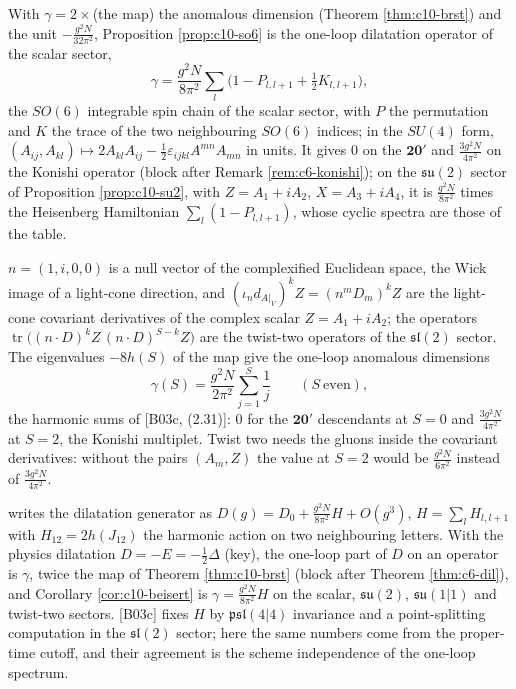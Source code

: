 \begin{remark}
With $\gamma=2\times$(the map) the anomalous dimension (Theorem \ref{thm:c10-brst}) and the unit $-\frac{g^2N}{32\pi^2}$, Proposition \ref{prop:c10-so6} is the one-loop dilatation operator of the scalar sector,
\[
\gamma=\frac{g^2N}{8\pi^2}\sum_{l}\big(1-P_{l,l+1}+\tfrac12K_{l,l+1}\big),
\]
the $SO(6)$ integrable spin chain of the scalar sector, with $P$ the permutation and $K$ the trace of the two neighbouring $SO(6)$ indices; in the $SU(4)$ form, $(A_{ij},A_{kl})\mapsto2A_{kl}A_{ij}-\tfrac12\varepsilon_{ijkl}A^{mn}A_{mn}$ in units. It gives $0$ on the $\mathbf{20'}$ and $\frac{3g^2N}{4\pi^2}$ on the Konishi operator (block after Remark \ref{rem:c6-konishi}); on the $\mathfrak{su}(2)$ sector of Proposition \ref{prop:c10-su2}, with $Z=A_1+iA_2$, $X=A_3+iA_4$, it is $\frac{g^2N}{8\pi^2}$ times the Heisenberg Hamiltonian $\sum_l(1-P_{l,l+1})$, whose cyclic spectra are those of the table.
\end{remark}

\begin{remark}
$n=(1,i,0,0)$ is a null vector of the complexified Euclidean space, the Wick image of a light-cone direction, and $(\iota_nd_{A|_V})^kZ=(n^mD_m)^kZ$ are the light-cone covariant derivatives of the complex scalar $Z=A_1+iA_2$; the operators $\operatorname{tr}\big((n\cdot D)^kZ\,(n\cdot D)^{S-k}Z\big)$ are the twist-two operators of the $\mathfrak{sl}(2)$ sector. The eigenvalues $-8h(S)$ of the map give the one-loop anomalous dimensions
\[
\gamma(S)=\frac{g^2N}{2\pi^2}\sum_{j=1}^S\frac1j\qquad(S\ \text{even}),
\]
the harmonic sums of [B03c, (2.31)]: $0$ for the $\mathbf{20'}$ descendants at $S=0$ and $\frac{3g^2N}{4\pi^2}$ at $S=2$, the Konishi multiplet. Twist two needs the gluons inside the covariant derivatives: without the pairs $(A_m,Z)$ the value at $S=2$ would be $\frac{g^2N}{6\pi^2}$ instead of $\frac{3g^2N}{4\pi^2}$.
\end{remark}

\begin{remark} writes the dilatation generator as $D(g)=D_0+\frac{g^2N}{8\pi^2}H+O(g^3)$, $H=\sum_lH_{l,l+1}$ with $H_{12}=2h(J_{12})$ the harmonic action on two neighbouring letters. With the physics dilatation $D=-E=-\tfrac12\Delta$ (key), the one-loop part of $D$ on an operator is $\gamma$, twice the map of Theorem \ref{thm:c10-brst} (block after Theorem \ref{thm:c6-dil}), and Corollary \ref{cor:c10-beisert} is $\gamma=\frac{g^2N}{8\pi^2}H$ on the scalar, $\mathfrak{su}(2)$, $\mathfrak{su}(1|1)$ and twist-two sectors. [B03c] fixes $H$ by $\mathfrak{psl}(4|4)$ invariance and a point-splitting computation in the $\mathfrak{sl}(2)$ sector; here the same numbers come from the proper-time cutoff, and their agreement is the scheme independence of the one-loop spectrum.
\end{remark}

